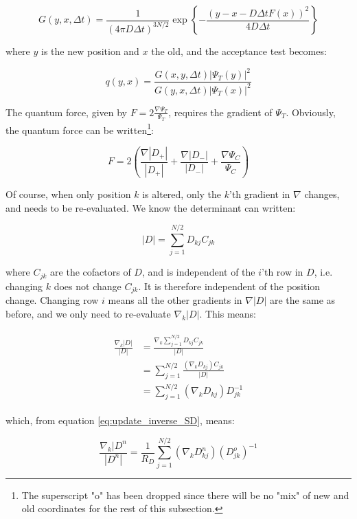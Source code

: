 \documentclass[english, a4paper]{article}
\begin{document}
\begin{equation}
	G(y,x,\Delta t) = \frac{1}{(4\pi D\Delta t)^{3N/2}}\exp\left\{ -\frac{(y-x-D\Delta tF(x))^2}{4D\Delta t} \right\}
\end{equation}

where $y$ is the new position and $x$ the old, and the acceptance test becomes:

\begin{equation}
	q(y,x) = \frac{G(x,y,\Delta t)|\Psi_T(y)|^2}{G(y,x,\Delta t)|\Psi_T(x)|^2}
\end{equation}

The quantum force, given by $F = 2\frac{\nabla \Psi_T}{\Psi_T}$, requires the gradient of $\Psi_T$. Obviously, the quantum force can be written\footnote{The superscript "o" has been dropped since there will be no "mix" of new and old coordinates for the rest of this subsection.}:

\begin{equation}
	F = 2\left(\frac{\nabla |D_+|}{|D_+|} + \frac{\nabla |D_-|}{|D_-|} + \frac{\nabla \Psi_C}{\Psi_C}\right)
\end{equation}

Of course, when only position $k$ is altered, only the $k$'th gradient in $\nabla$ changes, and needs to be re-evaluated. We know the determinant can written:

\begin{equation}
	|D| = \sum_{j=1}^{N/2}D_{kj}C_{jk}
\end{equation}

where $C_{jk}$ are the cofactors of $D$, and is independent of the $i$'th row in $D$, i.e. changing $k$ does not change $C_{jk}$. It is therefore independent of the position change. Changing row $i$ means all the other gradients in $\nabla|D|$ are the same as before, and we only need to re-evaluate $\nabla_k|D|$. This means:

\begin{align}
	\begin{split}
	\frac{\nabla_k|D|}{|D|} &= \frac{\nabla_k\sum_{j=1}^{N/2}D_{kj}C_{jk}}{|D|}\\
	&= \sum_{j=1}^{N/2}\frac{(\nabla_kD_{kj})C_{jk}}{|D|}\\
	&= \sum_{j=1}^{N/2}(\nabla_kD_{kj})D_{jk}^{-1}
	\end{split}
\end{align}

which, from equation \ref{eq:update_inverse_SD}, means:

\begin{equation}
	\frac{\nabla_k|D^n}{|D^n|} = \frac{1}{R_D}\sum_{j=1}^{N/2}(\nabla_kD_{kj}^n)(D_{jk}^o)^{-1}
\end{equation}
\end{document}

